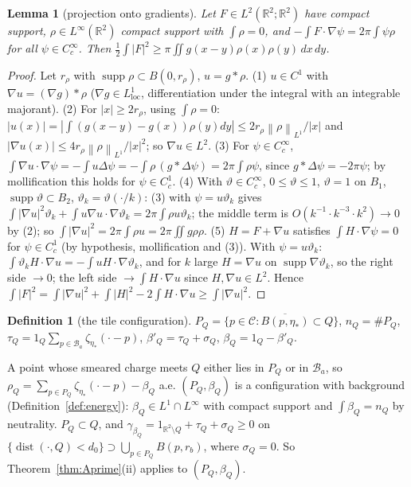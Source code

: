 \documentclass[11pt,reqno]{amsart}
\numberwithin{equation}{section}
\theoremstyle{plain}
\newtheorem{lemma}[theorem]{Lemma}
\theoremstyle{definition}
\newtheorem{definition}[theorem]{Definition}
\newcommand{\R}{\mathbb{R}}
\newcommand{\dist}{\operatorname{dist}}
\newcommand{\supp}{\operatorname{supp}}
\newcommand{\norm}[1]{\left\|#1\right\|}
\begin{document}
\begin{lemma}[projection onto gradients]\label{lem:projection}
Let $F\in L^2(\R^2;\R^2)$ have compact support, $\rho\in L^\infty(\R^2)$ compact support with $\int\rho=0$, and $-\int F\cdot\nabla\psi=2\pi\int\psi\rho$ for all $\psi\in C_c^\infty$.  Then $\frac12\int|F|^2\ge\pi\iint g(x-y)\rho(x)\rho(y)\,dx\,dy$.
\end{lemma}
\begin{proof}
Let $r_\rho$ with $\supp\rho\subset B(0,r_\rho)$, $u=g*\rho$.  (1) $u\in C^1$ with $\nabla u=(\nabla g)*\rho$ ($\nabla g\in L^1_{\mathrm{loc}}$, differentiation under the integral with an integrable majorant).  (2) For $|x|\ge2r_\rho$, using $\int\rho=0$: $|u(x)|=|\int(g(x-y)-g(x))\rho(y)dy|\le2r_\rho\norm\rho_{L^1}/|x|$ and $|\nabla u(x)|\le4r_\rho\norm\rho_{L^1}/|x|^2$; so $\nabla u\in L^2$.  (3) For $\psi\in C_c^\infty$, $\int\nabla u\cdot\nabla\psi=-\int u\Delta\psi=-\int\rho\,(g*\Delta\psi)=2\pi\int\rho\psi$, since $g*\Delta\psi=-2\pi\psi$; by mollification this holds for $\psi\in C_c^1$.  (4) With $\vartheta\in C_c^\infty$, $0\le\vartheta\le1$, $\vartheta=1$ on $B_1$, $\supp\vartheta\subset B_2$, $\vartheta_k=\vartheta(\cdot/k)$: (3) with $\psi=u\vartheta_k$ gives $\int|\nabla u|^2\vartheta_k+\int u\nabla u\cdot\nabla\vartheta_k=2\pi\int\rho u\vartheta_k$; the middle term is $O(k^{-1}\cdot k^{-3}\cdot k^2)\to0$ by (2); so $\int|\nabla u|^2=2\pi\int\rho u=2\pi\iint g\rho\rho$.  (5) $H=F+\nabla u$ satisfies $\int H\cdot\nabla\psi=0$ for $\psi\in C^1_c$ (by hypothesis, mollification and (3)).  With $\psi=u\vartheta_k$: $\int\vartheta_kH\cdot\nabla u=-\int uH\cdot\nabla\vartheta_k$, and for $k$ large $H=\nabla u$ on $\supp\nabla\vartheta_k$, so the right side $\to0$; the left side $\to\int H\cdot\nabla u$ since $H,\nabla u\in L^2$.  Hence $\int|F|^2=\int|\nabla u|^2+\int|H|^2-2\int H\cdot\nabla u\ge\int|\nabla u|^2$.
\end{proof}

\begin{definition}[the tile configuration]\label{def:tileconf}
$P_Q=\{p\in\mathcal C:\overline{B(p,\eta_*)}\subset Q\}$, $n_Q=\#P_Q$, $\tau_Q=1_Q\sum_{p\in\mathcal B_a}\zeta_{\eta_*}(\cdot-p)$, $\beta'_Q=\tau_Q+\sigma_Q$, $\beta_Q=1_Q-\beta'_Q$.
\end{definition}
A point whose smeared charge meets $Q$ either lies in $P_Q$ or in $\mathcal B_a$, so $\rho_Q=\sum_{p\in P_Q}\zeta_{\eta_*}(\cdot-p)-\beta_Q$ a.e.  $(P_Q,\beta_Q)$ is a configuration with background (Definition~\ref{def:energy}): $\beta_Q\in L^1\cap L^\infty$ with compact support and $\int\beta_Q=n_Q$ by neutrality.  $P_Q\subset Q$, and $\gamma_{\beta_Q}=1_{\R^2\setminus Q}+\tau_Q+\sigma_Q\ge0$ on $\{\dist(\cdot,Q)<d_0\}\supset\bigcup_{p\in P_Q}B(p,r_b)$, where $\sigma_Q=0$.  So Theorem~\ref{thm:Aprime}(ii) applies to $(P_Q,\beta_Q)$.
\end{document}
